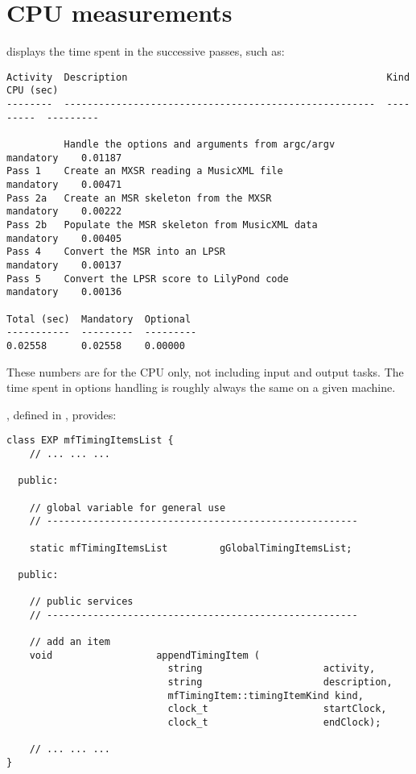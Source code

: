 
\chapter{CPU measurements}

 displays the time spent in the successive passes, such as:
\begin{lstlisting}[language=Terminal]
Activity  Description                                             Kind       CPU (sec)
--------  ------------------------------------------------------  ---------  ---------

          Handle the options and arguments from argc/argv         mandatory    0.01187
Pass 1    Create an MXSR reading a MusicXML file              mandatory    0.00471
Pass 2a   Create an MSR skeleton from the MXSR                mandatory    0.00222
Pass 2b   Populate the MSR skeleton from MusicXML data            mandatory    0.00405
Pass 4    Convert the MSR into an LPSR                            mandatory    0.00137
Pass 5    Convert the LPSR score to LilyPond code                 mandatory    0.00136

Total (sec)  Mandatory  Optional
-----------  ---------  ---------
0.02558      0.02558    0.00000
\end{lstlisting}

These numbers are for the CPU only, not including input and output tasks.
The time spent in options handling is roughly always the same on a given machine.

, defined in , provides:
\begin{lstlisting}[language=CPlusPlus]
class EXP mfTimingItemsList {
	// ... ... ...

  public:

    // global variable for general use
    // ------------------------------------------------------

    static mfTimingItemsList         gGlobalTimingItemsList;

  public:

    // public services
    // ------------------------------------------------------

    // add an item
    void                  appendTimingItem (
                            string                     activity,
                            string                     description,
                            mfTimingItem::timingItemKind kind,
                            clock_t                    startClock,
                            clock_t                    endClock);

	// ... ... ...
}
\end{lstlisting}

